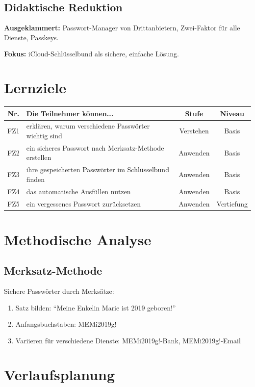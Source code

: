 \documentclass[11pt,a4paper]{article}
\begin{document}
\subsection{Didaktische Reduktion}
\textbf{Ausgeklammert:} Passwort-Manager von Drittanbietern, Zwei-Faktor für alle Dienste, Passkeys.

\textbf{Fokus:} iCloud-Schlüsselbund als sichere, einfache Lösung.

\section{Lernziele}

\begin{tabular}{|c|p{7cm}|c|c|}
\hline
\textbf{Nr.} & \textbf{Die Teilnehmer können...} & \textbf{Stufe} & \textbf{Niveau} \\
\hline
FZ1 & erklären, warum verschiedene Passwörter wichtig sind & Verstehen & Basis \\
FZ2 & ein sicheres Passwort nach Merksatz-Methode erstellen & Anwenden & Basis \\
FZ3 & ihre gespeicherten Passwörter im Schlüsselbund finden & Anwenden & Basis \\
FZ4 & das automatische Ausfüllen nutzen & Anwenden & Basis \\
FZ5 & ein vergessenes Passwort zurücksetzen & Anwenden & Vertiefung \\
\hline
\end{tabular}

\section{Methodische Analyse}

\subsection{Merksatz-Methode}
Sichere Passwörter durch Merksätze:
\begin{enumerate}
    \item Satz bilden: ``Meine Enkelin Marie ist 2019 geboren!''
    \item Anfangsbuchstaben: MEMi2019g!
    \item Variieren für verschiedene Dienste: MEMi2019g!-Bank, MEMi2019g!-Email
\end{enumerate}

\section{Verlaufsplanung}
\end{document}
